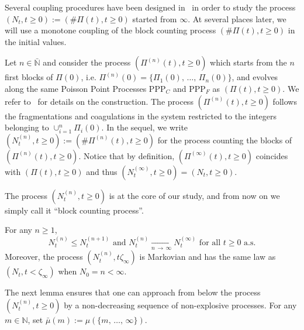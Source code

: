 \documentclass[AHL,Unicode,longabstracts,published]{cedram}
\newcommand{\PPP}{\mathrm{PPP}}
\newcommand{\bbN}{\mathbb{N}}
\begin{document}
Several coupling procedures have been designed in~\cite{cdiEFC} in order to study the process $(N_t,t\geq 0):=(\#\Pi(t),t\geq 0)$ started from $\infty$. At several places later, we will use a monotone coupling of the block counting process $(\#\Pi(t),t\geq 0)$ in the initial values.

Let $n\in \bar{\bbN}$ and consider the process $(\Pi^{(n)}(t),t\geq 0)$ which starts from the $n$ first blocks of $\Pi(0)$, i.e. $\Pi^{(n)}(0)=\{\Pi_1(0),\,\ldots,\,\Pi_n(0)\}$, and evolves along the same Poisson Point Processes $\PPP_C$ and $\PPP_F$ as $(\Pi(t),t\geq 0)$. We refer to~\cite[Lemma~3.3 and Lemma~3.4]{cdiEFC} for details on the construction. The process $(\Pi^{(n)}(t),t\geq 0)$ follows the fragmentations and coagulations in the system restricted to the integers belonging to $\cup_{i=1}^{n}\Pi_i(0)$. In the sequel, we write $(N_t^{(n)},t\geq 0):=(\#\Pi^{(n)}(t),t\geq 0)$ for the process counting the blocks of $(\Pi^{(n)}(t),t\geq 0)$. Notice that by definition, $(\Pi^{(\infty)}(t),t\geq 0)$ coincides with $(\Pi(t),t\geq 0)$ and thus $(N_t^{(\infty)},t\geq 0)=(N_t,t\geq 0)$.

The process $(N_t^{(n)},t\geq 0)$ is at the core of our study, and from now on we simply call it ``block counting process''.
\begin{lemm}\label{monotonicity}
For any $n\geq 1$,
\begin{equation*}
N_t^{(n)}\leq N^{(n+1)}_t\text{ and }N_t^{(n)}\underset{n\,\rightarrow\,\infty}{\longrightarrow} N^{(\infty)}_t\text{ for all }t\geq 0\text{ a.s.}
\end{equation*}
Moreover, the process $(N^{(n)}_t,t\zeta_{\infty})$ is Markovian and has the same law as $(N_t,t<\zeta_{\infty})$ when $N_0=n<\infty$.
\end{lemm}

The next lemma ensures that one can approach from below the process $(N_t^{(n)},t\geq 0)$ by a non-decreasing sequence of non-explosive processes. For any $m\in \bbN$, set $\bar{\mu}(m):=\mu(\{m,\,\ldots,\,\infty\})$.
\end{document}
